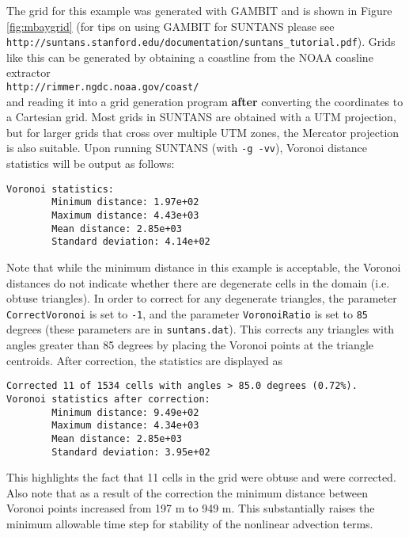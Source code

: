 The grid for this example was generated with GAMBIT and is shown in Figure \ref{fig:mbaygrid}
(for tips on using GAMBIT for SUNTANS please see\\
\verb+http://suntans.stanford.edu/documentation/suntans_tutorial.pdf+).
Grids like this can be generated by obtaining a coastline from the NOAA coasline extractor \\
\verb+http://rimmer.ngdc.noaa.gov/coast/+\\
and reading it into a grid generation program {\bf after} converting the coordinates to a Cartesian grid.
Most grids in SUNTANS are obtained with a UTM projection, but for larger grids that cross over multiple
UTM zones, the Mercator projection is also suitable.  
Upon running SUNTANS (with \verb+-g -vv+), Voronoi distance statistics will be output as follows:
\begin{verbatim}
Voronoi statistics:
        Minimum distance: 1.97e+02
        Maximum distance: 4.43e+03
        Mean distance: 2.85e+03
        Standard deviation: 4.14e+02
\end{verbatim}
Note that while the minimum distance in this example is acceptable, the Voronoi distances do
not indicate whether there are degenerate cells in the domain (i.e. obtuse triangles).  In order
to correct for any degenerate triangles, the parameter \verb+CorrectVoronoi+ is set to \verb+-1+,
and the parameter \verb+VoronoiRatio+ is set to \verb+85+ degrees (these parameters are in \verb+suntans.dat+).  
This corrects any triangles
with angles greater than 85 degrees by placing the Voronoi points at the triangle centroids.
After correction, the statistics are displayed as
\begin{verbatim}
Corrected 11 of 1534 cells with angles > 85.0 degrees (0.72%).
Voronoi statistics after correction:
        Minimum distance: 9.49e+02
        Maximum distance: 4.34e+03
        Mean distance: 2.85e+03
        Standard deviation: 3.95e+02
\end{verbatim}
This highlights the fact that 11 cells in the grid were obtuse and were corrected.  Also note that
as a result of the correction the minimum distance between Voronoi points increased from 197 m to
949 m.  This substantially raises the minimum allowable time step for stability of the nonlinear
advection terms.

